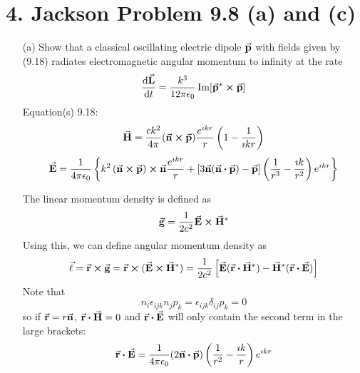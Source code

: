\documentclass[a4paper,twoside]{article}
\begin{document}
\section*{4. Jackson Problem 9.8 (a) and (c)}
\begin{itemize}
    \item[(a)] Show that a classical oscillating electric dipole $ \va{p} $ with fields given by (9.18) radiates electromagnetic angular momentum to infinity at the rate
        \begin{equation}
            \dv{ \va{L}}{t} = \frac{k^3}{12 \pi \epsilon_0} \Im[ \va{p}^* \cross \va{p}]
        \end{equation}
        Equation(s) 9.18:
        \begin{equation}
            \va{H} = \frac{ck^2}{4 \pi} ( \va{n} \cross \va{p}) \frac{e^{\imath kr}}{r} \left( 1 - \frac{1}{\imath kr} \right)
        \end{equation}
        \begin{equation}
            \va{E} = \frac{1}{4 \pi \epsilon_0} \left\{ k^2 \left( \va{n} \cross \va{p} \right) \cross \va{n} \frac{e^{\imath kr}}{r} + \left[ 3 \va{n} ( \va{n} \vdot \va{p}) - \va{p} \right]\left( \frac{1}{r^3} - \frac{\imath k}{r^2} \right) e^{\imath kr} \right\}
        \end{equation}
        \begin{problem}
            The linear momentum density is defined as
            \begin{equation}
                \va{g} = \frac{1}{2 c^2} \va{E} \cross \va{H}^*
            \end{equation}
            Using this, we can define angular momentum density as
            \begin{equation}
                \va{\ell} = \va{r} \cross \va{g} = \va{r} \cross ( \va{E} \cross \va{H}^*) = \frac{1}{2 c^2} \left[ \va{E} ( \va{r} \vdot \va{H}^*) - \va{H}^* ( \va{r} \vdot \va{E}) \right]
            \end{equation}
            Note that
            \begin{equation}
                n_i \epsilon_{ijk} n_j p_k = \epsilon_{ijk} \delta_{ij} p_k = 0
            \end{equation}
            so if $ \va{r} = r \va{n} $, $ \va{r} \vdot \va{H} = 0 $ and $ \va{r} \vdot \va{E} $ will only contain the second term in the large brackets:
            \begin{equation}
                \va{r} \vdot \va{E} = \frac{1}{4 \pi \epsilon_0} (2 \va{n} \vdot \va{p}) \left( \frac{1}{r^2} - \frac{\imath k}{r} \right) e^{\imath kr}

\end{equation}
\end{problem}
\end{itemize}
\end{document}
